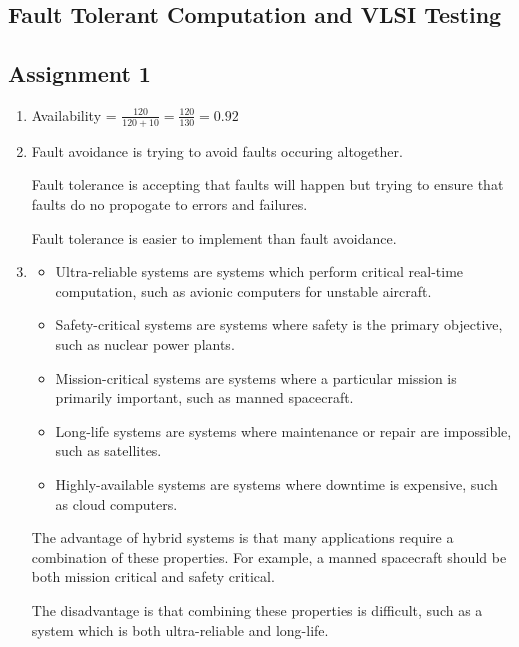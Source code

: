 \documentclass[a4paper,12pt]{article}
\begin{document}
    \begin{center}
        \section*{Fault Tolerant Computation and VLSI Testing}
        \subsection*{Assignment 1}
    \end{center}

    \begin{enumerate}

        \item Availability = $\frac{120}{120 + 10} = \frac{120}{130} = 0.92$

        \item Fault avoidance is trying to avoid faults occuring altogether.

        Fault tolerance is accepting that faults will happen but trying to ensure that faults do no propogate to errors and failures.

        Fault tolerance is easier to implement than fault avoidance.

        \item
        \begin{itemize}
            \item Ultra-reliable systems are systems which perform critical real-time computation, such as avionic computers for unstable aircraft.
            \item Safety-critical systems are systems where safety is the primary objective, such as nuclear power plants.
            \item Mission-critical systems are systems where a particular mission is primarily important, such as manned spacecraft.
            \item Long-life systems are systems where maintenance or repair are impossible, such as satellites.
            \item Highly-available systems are systems where downtime is expensive, such as cloud computers.
        \end{itemize}

        The advantage of hybrid systems is that many applications require a combination of these properties. For example, a manned spacecraft should be both mission critical and safety critical.

        The disadvantage is that combining these properties is difficult, such as a system which is both ultra-reliable and long-life.


\end{enumerate}
\end{document}
